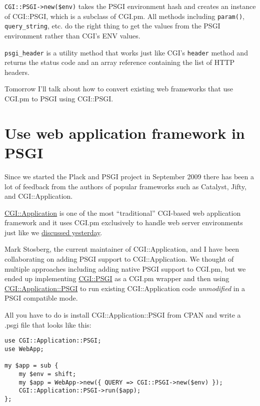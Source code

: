 \lstinline!CGI::PSGI->new($env)! takes the PSGI environment hash and
creates an instance of CGI::PSGI, which is a subclass of CGI.pm. All
methods including \lstinline!param()!, \lstinline!query_string!, etc. do
the right thing to get the values from the PSGI environment rather than
CGI's ENV values.

\lstinline!psgi_header! is a utility method that works just like CGI's
\lstinline!header! method and returns the status code and an array
reference containing the list of HTTP headers.

Tomorrow I'll talk about how to convert existing web frameworks that use
CGI.pm to PSGI using CGI::PSGI.

\chapter{Use web application framework in
PSGI}\label{day-7-use-web-application-framework-in-psgi}

Since we started the Plack and PSGI project in September 2009 there has
been a lot of feedback from the authors of popular frameworks such as
Catalyst, Jifty, and CGI::Application.

\href{http://cgi-app.org/}{CGI::Application} is one of the most
``traditional'' CGI-based web application framework and it uses CGI.pm
exclusively to handle web server environments just like we
\href{http://advent.plackperl.org/2009/12/day-6-convert-cgi-apps-to-psgi.html}{discussed
yesterday}.

Mark Stosberg, the current maintainer of CGI::Application, and I have
been collaborating on adding PSGI support to CGI::Application. We
thought of multiple approaches including adding native PSGI support to
CGI.pm, but we ended up implementing
\href{http://search.cpan.org/perldoc?CGI::PSGI}{CGI::PSGI} as a CGI.pm
wrapper and then using
\href{http://search.cpan.org/perldoc?CGI::Application::PSGI}{CGI::Application::PSGI}
to run existing CGI::Application code \emph{unmodified} in a PSGI
compatible mode.

All you have to do is install CGI::Application::PSGI from CPAN and write
a .psgi file that looks like this:

\begin{lstlisting}
use CGI::Application::PSGI;
use WebApp;

my $app = sub {
    my $env = shift;
    my $app = WebApp->new({ QUERY => CGI::PSGI->new($env) });
    CGI::Application::PSGI->run($app);
};
\end{lstlisting}

